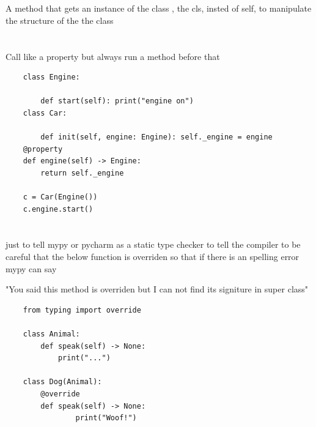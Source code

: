 \section{\@classmethod}

A method that gets an instance of the class , the cls, insted of self, to manipulate the structure of the the class

\section{\@staticmethod}

\section{\@property}

Call like a property but always run a method before that

\begin{verbatim}
    class Engine:

        def start(self): print("engine on")
    class Car:

        def init(self, engine: Engine): self._engine = engine
    @property
    def engine(self) -> Engine:
        return self._engine

    c = Car(Engine())
    c.engine.start()
\end{verbatim}

\section{\@override}

just to tell mypy or pycharm as a static type checker to tell the compiler to be careful that the below function is overriden so that if there is an spelling error mypy can say

"You said this method is overriden but I can not find its signiture in super class"

\begin{verbatim}
    from typing import override

    class Animal:
        def speak(self) -> None:
            print("...")

    class Dog(Animal):
        @override
        def speak(self) -> None:
                print("Woof!")
\end{verbatim}

